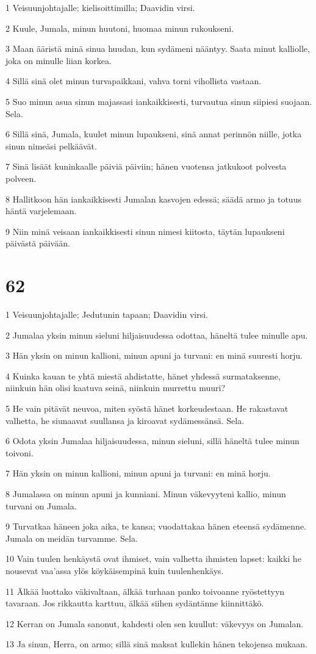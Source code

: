 \par 1 Veisuunjohtajalle; kielisoittimilla; Daavidin virsi.
\par 2 Kuule, Jumala, minun huutoni, huomaa minun rukoukseni.
\par 3 Maan ääristä minä sinua huudan, kun sydämeni nääntyy. Saata minut kalliolle, joka on minulle liian korkea.
\par 4 Sillä sinä olet minun turvapaikkani, vahva torni vihollista vastaan.
\par 5 Suo minun asua sinun majassasi iankaikkisesti, turvautua sinun siipiesi suojaan. Sela.
\par 6 Sillä sinä, Jumala, kuulet minun lupaukseni, sinä annat perinnön niille, jotka sinun nimeäsi pelkäävät.
\par 7 Sinä lisäät kuninkaalle päiviä päiviin; hänen vuotensa jatkukoot polvesta polveen.
\par 8 Hallitkoon hän iankaikkisesti Jumalan kasvojen edessä; säädä armo ja totuus häntä varjelemaan.
\par 9 Niin minä veisaan iankaikkisesti sinun nimesi kiitosta, täytän lupaukseni päivästä päivään.

\chapter{62}

\par 1 Veisuunjohtajalle; Jedutunin tapaan; Daavidin virsi.
\par 2 Jumalaa yksin minun sieluni hiljaisuudessa odottaa, häneltä tulee minulle apu.
\par 3 Hän yksin on minun kallioni, minun apuni ja turvani: en minä suuresti horju.
\par 4 Kuinka kauan te yhtä miestä ahdistatte, hänet yhdessä surmataksenne, niinkuin hän olisi kaatuva seinä, niinkuin murrettu muuri?
\par 5 He vain pitävät neuvoa, miten syöstä hänet korkeudestaan. He rakastavat valhetta, he siunaavat suullansa ja kiroavat sydämessänsä. Sela.
\par 6 Odota yksin Jumalaa hiljaisuudessa, minun sieluni, sillä häneltä tulee minun toivoni.
\par 7 Hän yksin on minun kallioni, minun apuni ja turvani: en minä horju.
\par 8 Jumalassa on minun apuni ja kunniani. Minun väkevyyteni kallio, minun turvani on Jumala.
\par 9 Turvatkaa häneen joka aika, te kansa; vuodattakaa hänen eteensä sydämenne. Jumala on meidän turvamme. Sela.
\par 10 Vain tuulen henkäystä ovat ihmiset, vain valhetta ihmisten lapset: kaikki he nousevat vaa'assa ylös köykäisempinä kuin tuulenhenkäys.
\par 11 Älkää luottako väkivaltaan, älkää turhaan panko toivoanne ryöstettyyn tavaraan. Jos rikkautta karttuu, älkää siihen sydäntänne kiinnittäkö.
\par 12 Kerran on Jumala sanonut, kahdesti olen sen kuullut: väkevyys on Jumalan.
\par 13 Ja sinun, Herra, on armo; sillä sinä maksat kullekin hänen tekojensa mukaan.

